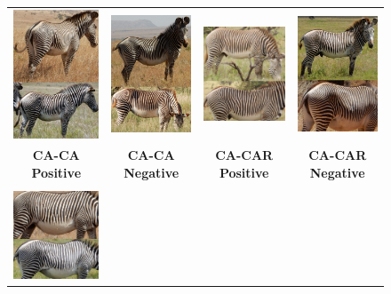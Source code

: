 \begin{figure}[!t]
\begin{center}
\begin{tabular}{cccc}
            \includegraphics[width=0.20\linewidth]{resources/pair-6083-8515-ca-ca-pos.pdf}     &
            \includegraphics[width=0.20\linewidth]{resources/pair-116-4597-ca-ca-neg.pdf}      &
            \includegraphics[width=0.20\linewidth]{resources/pair-3615-19342-ca-car-pos.pdf}   &
            \includegraphics[width=0.20\linewidth]{resources/pair-873-16541-ca-car-neg.pdf}      \\
            \textbf{CA-CA Positive}                                                            &
            \textbf{CA-CA Negative}                                                            &
            \textbf{CA-CAR Positive}                                                           &
            \textbf{CA-CAR Negative}                                                             \\
            \\
            \includegraphics[width=0.20\linewidth]{resources/pair-16277-17725-car-car-pos.pdf} &

\end{tabular}
\end{center}
\end{figure}
